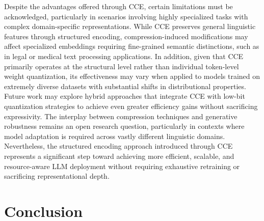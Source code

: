 \documentclass{article}
\begin{document}
Despite the advantages offered through CCE, certain limitations must be acknowledged, particularly in scenarios involving highly specialized tasks with complex domain-specific representations. While CCE preserves general linguistic features through structured encoding, compression-induced modifications may affect specialized embeddings requiring fine-grained semantic distinctions, such as in legal or medical text processing applications. In addition, given that CCE primarily operates at the structural level rather than individual token-level weight quantization, its effectiveness may vary when applied to models trained on extremely diverse datasets with substantial shifts in distributional properties. Future work may explore hybrid approaches that integrate CCE with low-bit quantization strategies to achieve even greater efficiency gains without sacrificing expressivity. The interplay between compression techniques and generative robustness remains an open research question, particularly in contexts where model adaptation is required across vastly different linguistic domains. Nevertheless, the structured encoding approach introduced through CCE represents a significant step toward achieving more efficient, scalable, and resource-aware LLM deployment without requiring exhaustive retraining or sacrificing representational depth.



\section{Conclusion}
\end{document}
